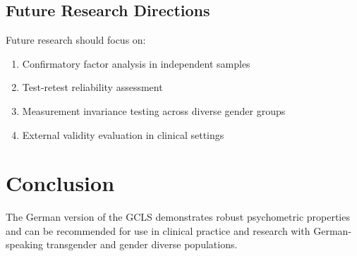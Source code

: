 \documentclass[12pt,a4paper]{article}
\begin{document}
\subsection{Future Research Directions}

Future research should focus on:

\begin{enumerate}
\item Confirmatory factor analysis in independent samples
\item Test-retest reliability assessment
\item Measurement invariance testing across diverse gender groups
\item External validity evaluation in clinical settings
\end{enumerate}

\section{Conclusion}

The German version of the GCLS demonstrates robust psychometric properties and can be recommended for use in clinical practice and research with German-speaking transgender and gender diverse populations.
\end{document}
